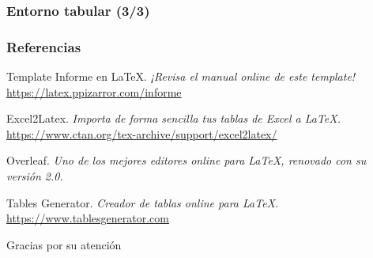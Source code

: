 \begin{frame}
	\frametitle{Entorno tabular (3/3)}
	\begin{tabularframehead}{3}
	\end{tabularframehead}
\end{frame}


\begin{frame}
	\frametitle{Referencias}
	\footnotesize{
		\begin{thebibliography}{99}
			Template Informe en \LaTeX.
			\textit{¡Revisa el manual online de este template!} \\
			\url{https://latex.ppizarror.com/informe}
			
			Excel2Latex.
			\textit{Importa de forma sencilla tus tablas de Excel a \LaTeX.} \\
			\url{https://www.ctan.org/tex-archive/support/excel2latex/}
			
			Overleaf.
			\textit{Uno de los mejores editores online para \LaTeX, renovado con su versión 2.0.} \\
			\href{https://www.overleaf.com?r=298b935f&rm=d&rs=b}{}
			
			Tables Generator.
			\textit{Creador de tablas online para \LaTeX.}\\
			\url{https://www.tablesgenerator.com}
		\end{thebibliography}
	}
\end{frame}


\begin{frame}
	\Huge{\centerline{Gracias por su atención}}
\end{frame}
